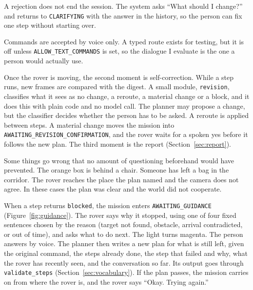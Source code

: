 A rejection does not end the session. The system asks ``What should I change?''
and returns to \texttt{CLARIFYING} with the answer in the history, so the person
can fix one step without starting over.

Commands are accepted by voice only. A typed route exists for testing, but it is
off unless \texttt{ALLOW\_TEXT\_COMMANDS} is set, so the dialogue I evaluate is
the one a person would actually use.

\label{ssec:revision}

Once the rover is moving, the second moment is self-correction. While a step
runs, new frames are compared with the digest. A small module, \texttt{revision},
classifies what it sees as no change, a reroute, a material change or a block,
and it does this with plain code and no model call. The planner may propose a
change, but the classifier decides whether the person has to be asked. A reroute
is applied between steps. A material change moves the mission into
\texttt{AWAITING\_REVISION\_CONFIRMATION}, and the rover waits for a spoken yes
before it follows the new plan. The third moment is the report
(Section~\ref{sec:report}).

\label{sec:recovery}

Some things go wrong that no amount of questioning beforehand would have
prevented. The orange box is behind a chair. Someone has left a bag in the
corridor. The rover reaches the place the plan named and the camera does not
agree. In these cases the plan was clear and the world did not cooperate.

When a step returns \texttt{blocked}, the mission enters
\texttt{AWAITING\_GUIDANCE} (Figure~\ref{fig:guidance}). The rover says why it
stopped, using one of four fixed sentences chosen by the reason (target not found,
obstacle, arrival contradicted, or out of time), and asks what to do next. The
light turns magenta. The person answers by voice. The planner then writes a new
plan for what is still left, given the original command, the steps already done,
the step that failed and why, what the rover has recently seen, and the
conversation so far. Its output goes through \texttt{validate\_steps}
(Section~\ref{sec:vocabulary}). If the plan passes, the mission carries on from
where the rover is, and the rover says ``Okay. Trying again.''

